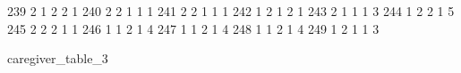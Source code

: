 \documentclass[
  letterpaper,
  DIV=11,
  numbers=noendperiod]{scrreprt}
\newenvironment{Shaded}{\begin{snugshade}}{\end{snugshade}}
\newcommand{\NormalTok}[1]{\textcolor[rgb]{0.00,0.23,0.31}{#1}}
\begin{document}
\begin{Shaded}
\begin{Highlighting}[]
\NormalTok{239         2         1     2    2        1}
\NormalTok{240         2         2     1    1        1}
\NormalTok{241         2         2     1    1        1}
\NormalTok{242         1         2     1    2        1}
\NormalTok{243         2         1     1    1        3}
\NormalTok{244         1         2     2    1        5}
\NormalTok{245         2         2     2    1        1}
\NormalTok{246         1         1     2    1        4}
\NormalTok{247         1         1     2    1        4}
\NormalTok{248         1         1     2    1        4}
\NormalTok{249         1         2     1    1        3}
\end{Highlighting}
\end{Shaded}

\begin{Shaded}
\begin{Highlighting}[]
\NormalTok{caregiver\_table\_3}
\end{Highlighting}
\end{Shaded}
\end{document}
